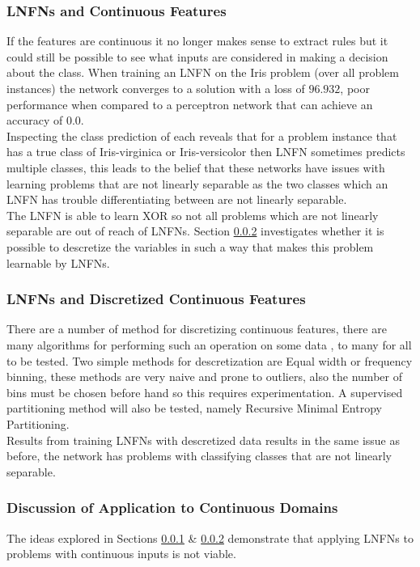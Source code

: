 \subsubsection{LNFNs and Continuous Features} \label{subsubsec:lnfns-cont-features}
If the features are continuous it no longer makes sense to extract rules but it could still be possible to see what inputs are considered in making a decision about the class. When training an LNFN on the Iris problem (over all problem instances) the network converges to a solution with a loss of $96.932$, poor performance when compared to a perceptron network that can achieve an accuracy of $0.0$. \\

Inspecting the class prediction of each reveals that for a problem instance that has a true class of Iris-virginica or Iris-versicolor then LNFN sometimes predicts multiple classes, this leads to the belief that these networks have issues with learning problems that are not linearly separable as the two classes which an LNFN has trouble differentiating between are not linearly separable.\\

The LNFN is able to learn XOR so not all problems which are not linearly separable are out of reach of LNFNs. Section \ref{subsubsec:lnfns-desc-cont-features} investigates whether it is possible to descretize the variables in such a way that makes this problem learnable by LNFNs.


\subsubsection{LNFNs and Discretized Continuous Features} \label{subsubsec:lnfns-desc-cont-features}
There are a number of method for discretizing continuous features, there are many algorithms for performing such an operation on some data \cite{liu2002discretization}, to many for all to be tested. Two simple methods for descretization are Equal width or frequency binning, these methods are very naive and prone to outliers, also the number of bins must be chosen before hand so this requires experimentation. A supervised partitioning method will also be tested, namely Recursive Minimal Entropy Partitioning.\\

Results from training LNFNs with descretized data results in the same issue as before, the network has problems with classifying classes that are not linearly separable.

\subsubsection{Discussion of Application to Continuous Domains}
The ideas explored in Sections \ref{subsubsec:lnfns-cont-features} \& \ref{subsubsec:lnfns-desc-cont-features} demonstrate that applying LNFNs to problems with continuous inputs is not viable.\\

